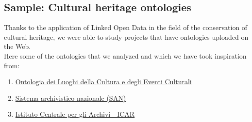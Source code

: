 \subsection{Sample: Cultural heritage ontologies}
Thanks to the application of Linked Open Data \cite{LOD} in the field of the conservation of cultural heritage, we were able to study projects that have ontologies uploaded on the Web.   
\\
Here some of the ontologies that we analyzed and which we have took inspiration from: 
\begin{enumerate}
    \item \href{https://dati.beniculturali.it/cultural-ON/ITA.html}{Ontologia dei Luoghi della Cultura e degli Eventi Culturali}
    \item \href{http://www.san.beniculturali.it/web/san/ontologia-san-lod}{Sistema archivistico nazionale (SAN)}
    \item \href{https://www.icar.beniculturali.it/attivita-e-progetti/progetti-icar-1/linked-open-data}{Istituto Centrale per gli Archivi - ICAR}
\end{enumerate}